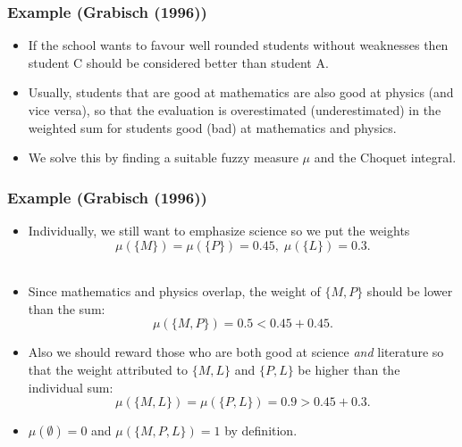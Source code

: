 \documentclass[envcountsect]{beamer}
\begin{document}
\begin{frame}
	\frametitle{Example (Grabisch (1996))}
\begin{itemize}
\item If the school wants to favour well rounded students without weaknesses then student C should be considered better than student A. \\
\item Usually, students that are good at mathematics are also good at physics (and vice versa), so that the evaluation is overestimated (underestimated) in the weighted sum for students good (bad) at mathematics and physics. \\
\item We solve this by finding a suitable fuzzy measure $\mu$ and the Choquet integral.
\end{itemize}

\end{frame}

\begin{frame}

	\frametitle{Example (Grabisch (1996))}
\begin{itemize}
\item Individually, we still want to emphasize science so we put the weights
$$\mu(\{M\}) = \mu(\{P\}) = 0.45, \; \mu(\{L\}) = 0.3.$$\\
\item Since mathematics and physics overlap, the weight of $\{M,P\}$ should be lower than the sum:
$$
\mu(\{M,P\}) = 0.5 < 0.45 + 0.45.
$$
\item Also we should reward those who are both good at science \emph{and} literature so that the weight attributed to $\{M,L\}$ and $\{P,L\}$ be higher than the individual sum:
$$
\mu(\{M,L\}) = \mu(\{P,L\}) = 0.9 > 0.45 + 0.3.
$$
\item $\mu(\emptyset) = 0$ and $\mu(\{M,P,L\}) = 1$ by definition.

\end{itemize}
\end{frame}
\end{document}
